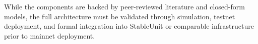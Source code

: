 \documentclass[11pt]{article}
\begin{document}
While the components are backed by peer-reviewed literature and closed-form models, the full architecture must be validated through simulation, testnet deployment, and formal integration into StableUnit or comparable infrastructure prior to mainnet deployment.



\printbibliography
\end{document}
